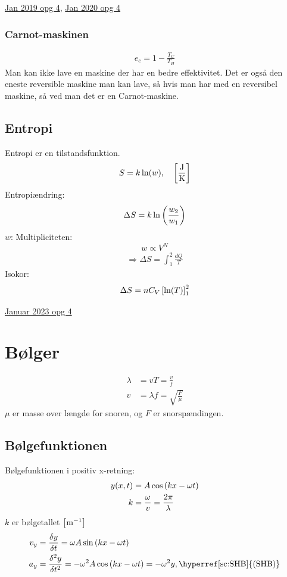\documentclass[a4paper,oneside,article]{memoir}
\begin{document}
\hyperref[asc:Jan 2019 opg 4]{Jan 2019 opg 4}, \hyperref[asc:Jan 2020 opg 4]{Jan 2020 opg 4}

\subsection{Carnot-maskinen} \label{ssc:carnot}
\begin{align*}
    e_c = 1-\frac{T_C}{T_H}
\end{align*}
Man kan ikke lave en maskine der har en bedre effektivitet. Det er også den eneste reversible maskine man kan lave, så hvis man har med en reversibel maskine, så ved man det er en Carnot-maskine.

\section{Entropi} \label{sc:entropi}
Entropi er en tilstandsfunktion. 
\begin{align*}
    S = k\ln(w),\quad \br[2]{\frac{\text{J}}{\text{K}}}
\end{align*}
Entropiændring: \[\Delta S = k\ln\br{\frac{w_2}{w_1}}\]
$w$: Multipliciteten: \[w\propto V^N\]
\begin{align*}
    \Rightarrow \Delta S = \int_1^2\frac{dQ}{T}
\end{align*}
Isokor: \[\Delta S = nC_V\br[2]{\ln(T)}_1^2\]

\hyperref[asc:Januar 2023 opg 4]{Januar 2023 opg 4}

\newpage
\chapter{Bølger} \label{ch:bølger}
\begin{align*}
    \lambda &= vT = \frac{v}{f} \\
    v &= \lambda f = \sqrt{\frac{F}{\mu}}
\end{align*}
$\mu$ er masse over længde for snoren, og $F$ er snorspændingen. 

\section{Bølgefunktionen} \label{sc:bølgefunktionen}
Bølgefunktionen i positiv x-retning:
\begin{align*}
    y(x,t)&=A\cos\br{kx-\omega t} \\
    k&= \frac{\omega}{v}=\frac{2\pi}{\lambda}
\end{align*}
$k$ er bølgetallet $\br[2]{\text{m}^{-1}}$
\begin{align*}
    v_y &= \frac{\delta y}{\delta t} = \omega A\sin\br{kx-\omega t} \\
    a_y &= \frac{\delta^2 y}{\delta t^2}=-\omega^2A\cos\br{kx-\omega t} = -\omega^2y, \text{\hyperref[sc:SHB]{(SHB)}}
\end{align*}
\end{document}

